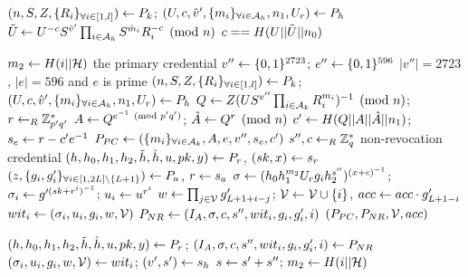 \documentclass{article}
\begin{document}
\begin{algorithm}
\caption{$\verifyph$}
\label{alg:phverify}
\begin{algorithmic}
	\State $\pk \la P_{k}$; $\ph \la P_{h}$
	\State $\zkv{U}{}{c}{S}{v}{'}\prodi{i}{\ah}{S^{\hat{m}_{i}}R_{i}^{-c}}\pmod{n}$
	\State \Return $c == H(U||\td{U}||n_{0})$
\end{algorithmic}
\end{algorithm}

\begin{algorithm}
\caption{$\issuetp$}
\label{alg:ci2}
\begin{algorithmic}
	\State $m_{2}\la H(i||\mc{H})$
	\Comment the primary credential
	\State $v''\la \binbits{2723}$; $e''\la \binbits{596}$
	\Comment $|v''|= 2723$, $|e| = 596$ and $e$ is prime
	\State $\pk \la P_{k}$; $\ph \la P_{h}$
	\State $Q\la Z(US^{v''}\prodi{i}{\ak}{R_{i}^{m_{i}}})^{-1}\pmod{n}$; $r\lar \mbz{p'q'}$
	\State $A\la Q^{e^{-1}\pmod{p'q'}}$; $\hat{A}\la Q^{r}\pmod{n}$
	\State $c'\la H(Q||A||\hat{A}||n_{1})$; $s_{e}\la r -c'e^{-1}$
	\State $P_{PC}\la \ppc$
	\State $s'', c\lar \mbz{q}$
	\Comment non-revocation credential
	\State $\pr \la P_{r}$, $(sk, x)\la s_{r}$
	\State $\pa \la P_{a}$, $r\la s_{a}$
	\State $\sigma \la (h_{0}h_{1}^{m_{2}}U_{r}g_{i}h_{2}^{s''})^{(x+c)^{-1}}$; $\sigma _{i} \la g'^{(sk + r^{i})^{-1}}$; $u_{i}\la u^{r^{i}}$
	\State $w\la \prodi{j}{\mc{V}}{g'_{L+1+i-j}}$; $\mc{V}\la \mc{V}\cup \{i\}$, $acc\la acc\cdot g'_{L+1-i}$
	\State $wit_{i}\la \witi $
	\State $P_{NR}\la \pnr$
	\State \Return $(P_{PC}, P_{NR}, \mc{V}, acc)$
\end{algorithmic}
\end{algorithm}

\begin{algorithm}
\caption{$\verifypnr $}
\label{alg:pnrverify}
\begin{algorithmic}
	\State $\pr \la P_{r}$; $\pnr \la P_{NR}$
	\State $\witi \la wit_{i}$; $\sh \la s_{h}$
	\State $s\la s' + s''$; $m_2\la H(i||\mc{H})$
		\State $\mbox{    }$\Return \false
		\State $\mbox{    }$\Return \false
		\State $\mbox{    }$\Return \false
	\Else 
		\State $\mbox{    }$\Return \true
	\EndIf
\end{algorithmic}
\end{algorithm}
\end{document}
